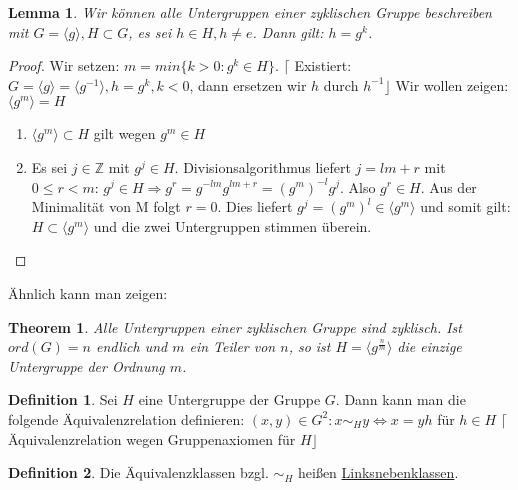 \documentclass[fleqn, 12pt]{scrartcl}
\newtheorem{thm}{Theorem}
\newtheorem{lemma}{Lemma}
\theoremstyle{definition}
\newtheorem*{defn}{Definition}
\theoremstyle{remark}
\begin{document}
\begin{lemma}
	Wir können alle Untergruppen einer zyklischen Gruppe beschreiben mit \(G = \langle g \rangle, H \subset G\), es sei \(h \in H, h \neq e\). Dann gilt: \(h = g^{k}\).
\end{lemma}

\begin{proof}
	Wir setzen: \(m = min \lbrace k>0 : g^{k} \in H \rbrace\). \newline \(\lceil\) Existiert: \(G= \langle g \rangle = \langle g^{-1} \rangle, h = g^{k}, k<0\), dann ersetzen wir \(h\) durch \(h^{-1} \rfloor\) \newline Wir wollen zeigen: \(\langle g^{m} \rangle = H\) 
	\begin{enumerate}
		\item \(\langle g^{m} \rangle \subset H\) gilt wegen \(g^{m} \in H\)
		\item Es sei \(j \in  \mathbb{Z}\) mit \(g^{j} \in H\). Divisionsalgorithmus liefert \(j=lm+r\) mit \(0 \leq r < m\): \(g^{j} \in H \Rightarrow g^{r}=g^{-lm}g^{lm+r}=(g^{m})^{-l}g^{j}\). Also \(g^{r} \in H\). Aus der Minimalität von M folgt \(r=0\). Dies liefert \(g^{j}=(g^{m})^{l} \in \langle g^{m} \rangle\) und somit gilt: \(H \subset \langle g^{m} \rangle\) und die zwei Untergruppen stimmen überein.
	\end{enumerate}
\end{proof}

Ähnlich kann man zeigen:

\begin{thm}
	Alle Untergruppen einer zyklischen Gruppe sind zyklisch. Ist \(ord(G)=n\) endlich und \(m\) ein Teiler von \(n\), so ist \(H = \langle g^{\frac{n}{m}}\rangle\) die einzige Untergruppe der Ordnung \(m\).
\end{thm}

\begin{defn}
	Sei \(H\) eine Untergruppe der Gruppe \(G\). Dann kann man die folgende Äquivalenzrelation definieren: \newline \((x,y) \in G^{2}: x \sim_{H} y \Leftrightarrow x = yh\) für \(h \in H\) \newline \(\lceil\)Äquivalenzrelation wegen Gruppenaxiomen für \(H\rfloor\)
\end{defn}

\begin{defn}
	Die Äquivalenzklassen bzgl. \(\sim_{H}\) heißen \underline{Linksnebenklassen}.
\end{defn}
\end{document}
